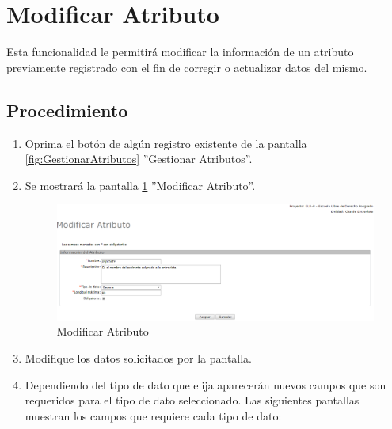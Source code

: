 \hypertarget{cv:modificarAtributo}{\section{Modificar Atributo}} \label{sec:modificarAtributo}

	Esta funcionalidad le permitirá modificar la información de un atributo previamente registrado con el fin de corregir o actualizar datos del mismo. 

		\subsection{Procedimiento}

			\begin{enumerate}
	
			\item Oprima el botón \IUEditar{} de algún registro existente de la pantalla \ref{fig:GestionarAtributos} ''Gestionar Atributos''.
	
			\item Se mostrará la pantalla \ref{fig:modificarAtributo} ''Modificar Atributo''.
			
			\begin{figure}[htbp!]
				\begin{center}
					\includegraphics[scale=0.5]{roles/lider/entidades/atributos/pantallas/IU12-1-2modificarAtributo}
					\caption{Modificar Atributo}
					\label{fig:modificarAtributo}
				\end{center}
			\end{figure}
		
			\item Modifique los datos solicitados por la pantalla.
			
			\item Dependiendo del tipo de dato que elija aparecerán nuevos campos que son requeridos para el tipo de dato seleccionado. Las siguientes pantallas muestran los campos que requiere cada tipo de dato:
			

\end{enumerate}
